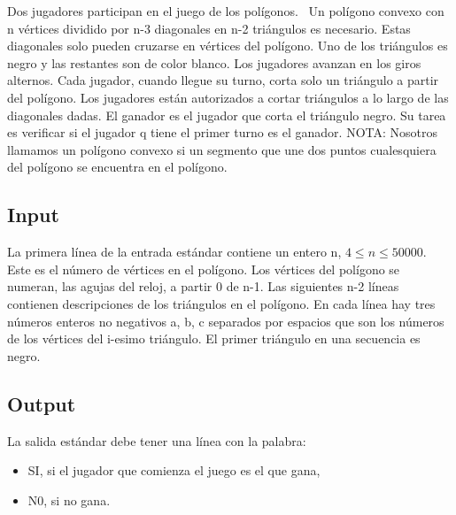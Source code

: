
Dos jugadores participan en el juego de los polígonos.  Un polígono convexo con n vértices dividido por n-3 diagonales en n-2 triángulos es necesario. Estas diagonales solo pueden cruzarse en vértices del polígono. Uno de los triángulos es negro y las restantes son de color blanco. Los jugadores avanzan en los giros alternos. Cada jugador, cuando llegue su turno, corta solo un triángulo a partir del polígono. Los jugadores están autorizados a cortar triángulos a lo largo de las diagonales dadas. El ganador es el jugador que corta el triángulo negro.
Su tarea es verificar si el jugador q tiene el primer turno es el ganador.
NOTA: Nosotros llamamos un polígono convexo si un segmento que une dos puntos cualesquiera del polígono se encuentra en el polígono.

\subsection*{Input}

La primera línea de la entrada estándar contiene un entero n, $4 \leq n \leq 50000$. Este es el número de vértices en el polígono. Los vértices del polígono se numeran, las agujas del reloj, a partir 0 de n-1. Las siguientes n-2 líneas contienen descripciones de los triángulos en el polígono. En cada línea hay tres números enteros no negativos a, b, c separados por espacios que son los números de los vértices del i-esimo triángulo. El primer triángulo en una secuencia es negro.

\subsection*{Output}

La salida estándar debe tener una línea con la palabra:

\begin{itemize}
  \item SI, si el jugador que comienza el juego es el que gana,
  \item N0, si no gana.
\end{itemize}

\datos
